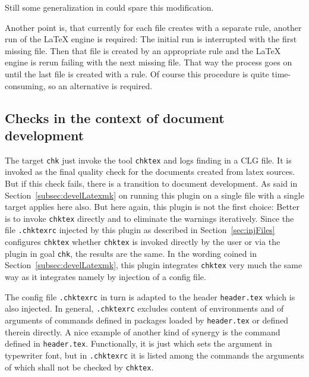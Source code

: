Still some generalization in  could spare this modification. 

Another point is, that currently for each file  creates with a separate rule, 
another run of the \LaTeX{} engine is required: 
The initial run is interrupted with the first missing file. 
Then that file is created by an appropriate rule and the \LaTeX{} engine is rerun 
failing with the next missing file. 
That way the process goes on until the last file is created with a rule. 
Of course this procedure is quite time-consuming, so an alternative is required. 



\subsection{Checks in the context of document development}\label{subsec:develCheck}

The target \texttt{chk} just invoke the tool \texttt{chktex} and logs finding in a CLG file. 
It is invoked as the final quality check for the documents created from latex sources. 
But if this check fails, there is a transition to document development. 
As said in Section~\ref{subsec:develLatexmk} on running this plugin on a single file with a single target 
applies here also. 
But here again, this plugin is not the first choice: Better is to invoke \texttt{chktex} directly 
and to eliminate the warnings iteratively. 
Since the file \texttt{.chktexrc} injected by this plugin as described in Section~\ref{sec:injFiles} 
configures \texttt{chktex} whether \texttt{chktex} is invoked directly by the user 
or via the plugin in goal \texttt{chk}, the results are the same. 
In the wording coined in Section~\ref{subsec:develLatexmk}, 
this plugin integrates \texttt{chktex} very much the same way as it integrates  
namely by injection of a config file. 

The config file \texttt{.chktexrc} in turn is adapted to the header \texttt{header.tex} 
which is also injected. 
In general, \texttt{.chktexrc} excludes content of environments 
and of arguments of commands defined in packages loaded by \texttt{header.tex} 
or defined therein directly. 
A nice example of another kind of synergy is the command  
defined in \texttt{header.tex}. 
Functionally, it is just  which sets the argument in typewriter font, 
but in \texttt{.chktexrc} it is listed among the commands 
the arguments of which shall not be checked by \texttt{chktex}. 
\medskip



